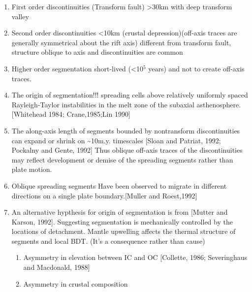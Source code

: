 \documentclass[11pt]{article}
\begin{document}
\begin{enumerate}
\item First order discontinuities (Transform fault)
\label{sec-1-1-1-1}
>30km with deep transform valley 
\item Second order discontinuities
\label{sec-1-1-1-2}
<10km (crustal depression)(off-axis traces are generally symmetrical about the rift axis)  different from transform fault, structure oblique to axis and discontinuities are common
\item Higher order segmentation short-lived (<10$^{\text{5}}$ years) and not to create off-axis traces.
\label{sec-1-1-1-3}
\item The origin of segmentation!!! 
\label{sec-1-1-1-4}
spreading cells above relatively uniformly spaced Rayleigh-Taylor instabilities in the melt zone of the subaxial asthenosphere.[Whitehead 1984; Crane,1985;Lin 1990]
\item The along-axis length of segments bounded by nontransform discontinuities can expand or shrink on \textasciitilde{}10m.y. timescales [Sloan and Patriat, 1992; Pockalny and Gente, 1992]  
\label{sec-1-1-1-5}
Thus oblique off-axis traces of the discontinuities may reflect development or demise of the spreading segments rather than plate motion.
\item Oblique spreading segments
\label{sec-1-1-1-6}
Have been observed to migrate in different directions on a single plate boundary.[Muller and Roest,1992] 
\item An alternative hypthesis for origin of segmentation is from [Mutter and Karson, 1992]. Suggesting segmentation is mechanically controlled by the locations of detachment.  Mantle upwelling affects the thermal structure of segments and local BDT. (It's a consequence rather than cause) 
\label{sec-1-1-1-7}
\begin{enumerate}
\item Asymmetry in elevation between IC and OC [Collette, 1986; Severinghaus and Macdonald, 1988]
\label{sec-1-1-1-7-1}
\item Asymmetry in crustal composition

\end{enumerate}
\end{enumerate}
\end{document}
